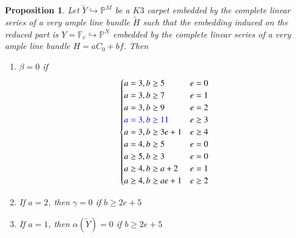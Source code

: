 \documentclass[11pt,twoside]{amsart}
\theoremstyle{plain}
\numberwithin{equation}{section}
\newtheorem{proposition}[theorem]{Proposition}
\theoremstyle{definition}
\begin{document}
\begin{proposition}\label{calculating beta}
Let $\widetilde{Y} \hookrightarrow \mathbb{P}^M$ be a $K3$ carpet embedded by the complete linear series of a very ample line bundle $\widetilde{H}$ such that the embedding induced on the reduced part is $Y = \mathbb{F}_e \hookrightarrow \mathbb{P}^N$ embedded by the complete linear series of a very ample line bundle $H = aC_0+bf$.   
Then 

\begin{enumerate}
    \item $\beta = 0$ if
    \[
\begin{cases}
    a = 3, b \geq 5 & e = 0  \\
    a = 3, b \geq 7 & e = 1  \\
    a = 3, b \geq 9 & e = 2  \\
\color{blue}
    a = 3, b \geq 11 & e \geq 3 \\
    a = 3, b \geq 3e+1 & e \geq 4 \\
\color{black}
    a = 4, b \geq 5 & e = 0 \\
    a \geq 5, b \geq 3 & e = 0 \\
    a \geq 4, b \geq a+2 & e = 1 \\
    a \geq 4, b \geq ae+1 & e \geq 2 \\
    
\end{cases}
  \]

  \item If $a = 2$, then $\gamma = 0$ if $b \geq 2e+5$

  \item If $a = 1$, then $\alpha(\widetilde{Y}) = 0$ if $b \geq 2e+5$


\end{enumerate}
  

 


\end{proposition}
 
\end{document}

